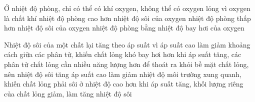 \begin{ex}
	Ở nhiệt độ phòng, chỉ có thể có khí oxygen, không thể có oxygen lỏng vì
	\choice
	{oxygen là chất khí}
	{\True nhiệt độ phòng cao hơn nhiệt độ sôi của oxygen}
	{nhiệt độ phòng thấp hơn nhiệt độ sôi của oxygen}
	{nhiệt độ phòng bằng nhiệt độ bay hơi của oxygen}
	\end{ex}



\begin{ex} 
	Nhiệt độ sôi của một chất lại tăng theo áp suất vì
	\choice
	{áp suất cao làm giảm khoảng cách giữa các phân tử, khiến chất lỏng khó bay hơi hơn}
	{\True khi áp suất tăng, các phân tử chất lỏng cần nhiều năng lượng hơn để thoát ra khỏi bề mặt chất lỏng, nên nhiệt độ sôi tăng}
	{áp suất cao làm giảm nhiệt độ môi trường xung quanh, khiến chất lỏng phải sôi ở nhiệt độ cao hơn}
	{khi áp suất tăng, khối lượng riêng của chất lỏng giảm, làm tăng nhiệt độ sôi}
\end{ex}

